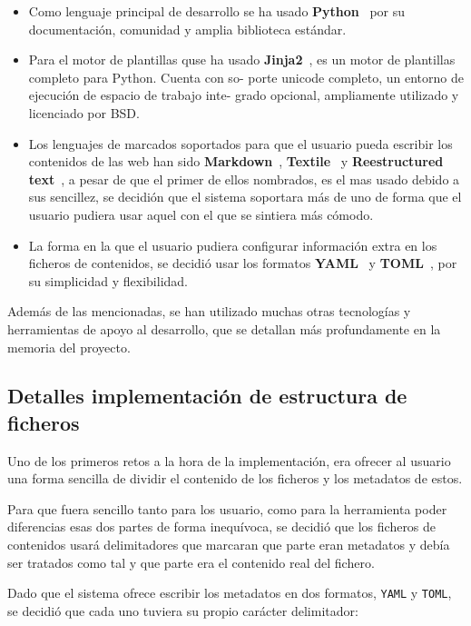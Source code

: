 \documentclass[a4paper,12pt]{article}
\begin{document}
\begin{itemize}
\item Como lenguaje principal de desarrollo se ha usado \textbf{Python}~\cite{python} por su
documentación, comunidad y amplia biblioteca estándar.

\item Para el motor de plantillas quse ha usado \textbf{Jinja2}~\cite{jinja}, es un motor de
plantillas completo para Python. Cuenta con so-
porte unicode completo, un entorno de ejecución de espacio de trabajo inte-
grado opcional, ampliamente utilizado y licenciado por BSD.

\item Los lenguajes de marcados soportados para que el usuario pueda escribir los contenidos de las web
han sido \textbf{Markdown}~\cite{markdown}, \textbf{Textile}~\cite{textile} y
\textbf{Reestructured text}~\cite{restructuredtext}, a pesar de que el primer de ellos nombrados, es el mas usado
debido a sus sencillez, se decidión que el sistema soportara más de uno de forma que el usuario pudiera usar aquel
con el que se sintiera más cómodo.

\item La forma en la que el usuario pudiera configurar información extra en los ficheros de contenidos, se decidió usar
    los formatos \textbf{YAML}~\cite{toml} y \textbf{TOML}~\cite{yaml}, por su simplicidad y flexibilidad.
\end{itemize}

Además de las mencionadas, se han utilizado muchas otras tecnologías y herramientas de apoyo
al desarrollo, que se detallan más profundamente en la memoria del proyecto.

\subsection{Detalles implementación de estructura de ficheros}

Uno de los primeros retos a la hora de la implementación, era ofrecer al usuario una forma sencilla de dividir
el contenido de los ficheros y los metadatos de estos.

Para que fuera sencillo tanto para los usuario, como para la herramienta poder diferencias esas dos partes
de forma inequívoca, se decidió que los ficheros de contenidos usará delimitadores que marcaran que
parte eran metadatos y debía ser tratados como tal y que parte era el contenido real del fichero.

Dado que el sistema ofrece escribir los metadatos en dos formatos, \texttt{YAML} y \texttt{TOML}, se decidió que cada
uno tuviera su propio carácter delimitador:
\end{document}

